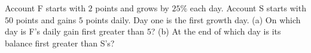 Account F starts with $2$ points and grows by $25\%$ each day. Account S starts with $50$ points and gains $5$ points daily. Day one is the first growth day. (a) On which day is F's daily gain first greater than $5$? (b) At the end of which day is its balance first greater than S's?
